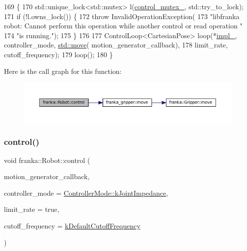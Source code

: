 \begin{DoxyCode}
169                              \{
170   std::unique\_lock<std::mutex> l(\hyperlink{classfranka_1_1Robot_a719ad1fab76f8edfc9f6f761671c1375}{control\_mutex\_}, std::try\_to\_lock);
171   \textcolor{keywordflow}{if} (!l.owns\_lock()) \{
172     \textcolor{keywordflow}{throw} InvalidOperationException(
173         \textcolor{stringliteral}{"libfranka robot: Cannot perform this operation while another control or read operation "}
174         \textcolor{stringliteral}{"is running."});
175   \}
176 
177   ControlLoop<CartesianPose> loop(*\hyperlink{classfranka_1_1Robot_aca155054184e5b6478942fd6a1b82ba4}{impl\_}, controller\_mode, \hyperlink{namespacefranka__gripper_a1356a87108d2229401d3755bd3e53bdf}{std::move}(
      motion\_generator\_callback),
178                                   limit\_rate, cutoff\_frequency);
179   loop();
180 \}
\end{DoxyCode}
Here is the call graph for this function\+:
\nopagebreak
\begin{figure}[H]
\begin{center}
\leavevmode
\includegraphics[width=350pt]{classfranka_1_1Robot_a6e59bd7b50b2de2e9e54f0b60d1a552e_cgraph}
\end{center}
\end{figure}
\mbox{\label{classfranka_1_1Robot_a5d39a89a41edee89a776c3491dd20738}} 
\subsubsection{\texorpdfstring{control()}{control()}\hspace{0.1cm}{\footnotesize\ttfamily [9/9]}}
{\footnotesize\ttfamily void franka\+::\+Robot\+::control (\begin{DoxyParamCaption}\item[{std\+::function$<$ \hyperlink{classfranka_1_1CartesianVelocities}{Cartesian\+Velocities}(const \hyperlink{structfranka_1_1RobotState}{Robot\+State} \&, \hyperlink{classfranka_1_1Duration}{franka\+::\+Duration})$>$}]{motion\+\_\+generator\+\_\+callback,  }\item[{\hyperlink{namespacefranka_a3e20bc77587e2c0c53598753e3f4816b}{Controller\+Mode}}]{controller\+\_\+mode = {\ttfamily \hyperlink{namespacefranka_a3e20bc77587e2c0c53598753e3f4816baa7cd8fc7552b5b9c50684e57f032d724}{Controller\+Mode\+::k\+Joint\+Impedance}},  }\item[{\hyperlink{classbool}{bool}}]{limit\+\_\+rate = {\ttfamily true},  }\item[{double}]{cutoff\+\_\+frequency = {\ttfamily \hyperlink{namespacefranka_ad8e3b7da346e03181ab5ac138a4171d4}{k\+Default\+Cutoff\+Frequency}} }\end{DoxyParamCaption})}

